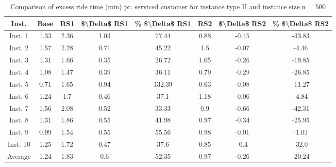 \begin{table}[H]
\centering
\begin{tabular}{cccccccc}
  \hline
  \textbf{Inst.} & \textbf{Base} & \textbf{RS1} & \textbf{\$\textbackslash{}Delta\$  RS1} & \textbf{\% \$\textbackslash{}Delta\$  RS1} & \textbf{RS2} & \textbf{\$\textbackslash{}Delta\$  RS2} & \textbf{\% \$\textbackslash{}Delta\$  RS2} \\\hline
  Inst. 1 & 1.33 & 2.36 & 1.03 & 77.44 & 0.88 & -0.45 & -33.83 \\
  Inst. 2 & 1.57 & 2.28 & 0.71 & 45.22 & 1.5 & -0.07 & -4.46 \\
  Inst. 3 & 1.31 & 1.66 & 0.35 & 26.72 & 1.05 & -0.26 & -19.85 \\
  Inst. 4 & 1.08 & 1.47 & 0.39 & 36.11 & 0.79 & -0.29 & -26.85 \\
  Inst. 5 & 0.71 & 1.65 & 0.94 & 132.39 & 0.63 & -0.08 & -11.27 \\
  Inst. 6 & 1.24 & 1.7 & 0.46 & 37.1 & 1.18 & -0.06 & -4.84 \\
  Inst. 7 & 1.56 & 2.08 & 0.52 & 33.33 & 0.9 & -0.66 & -42.31 \\
  Inst. 8 & 1.31 & 1.86 & 0.55 & 41.98 & 0.97 & -0.34 & -25.95 \\
  Inst. 9 & 0.99 & 1.54 & 0.55 & 55.56 & 0.98 & -0.01 & -1.01 \\
  Inst. 10 & 1.25 & 1.72 & 0.47 & 37.6 & 0.85 & -0.4 & -32.0 \\
  Average & 1.24 & 1.83 & 0.6 & 52.35 & 0.97 & -0.26 & -20.24 \\\hline
\end{tabular}
\caption{Comparison of excess ride time (min) pr. serviced customer for instance type II and instance size n = 500}
\label{tab:wait:resrelocation-excess-ride-time-comparison_II_500}
\end{table}

